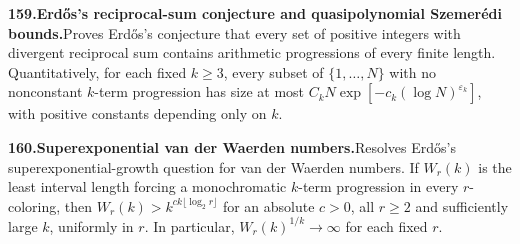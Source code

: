 \documentclass[11pt,a4paper]{article}
\begin{document}
  \par \begin{minipage}{\linewidth}
  \fontsize{10.5}{12.6}\selectfont\RaggedRight
  \hypertarget{result 159}{}
  {\bfseries\textcolor{muted}{159.}\enspace Erd\H{o}s's reciprocal-sum conjecture and quasipolynomial Szemer\'edi bounds.}\enspace Proves Erd\H{o}s's conjecture that every set of positive integers with divergent reciprocal sum contains arithmetic progressions of every finite length. Quantitatively, for each fixed $k\ge3$, every subset of $\{1,\ldots,N\}$ with no nonconstant $k$-term progression has size at most $C_kN\exp[-c_k(\log N)^{\varepsilon_k}]$, with positive constants depending only on $k$.\par
  \end{minipage}\par\vspace{5pt}



  \par \begin{minipage}{\linewidth}
  \fontsize{10.5}{12.6}\selectfont\RaggedRight
  \hypertarget{result 160}{}
  {\bfseries\textcolor{muted}{160.}\enspace Superexponential van der Waerden numbers.}\enspace Resolves Erd\H{o}s's superexponential-growth question for van der Waerden numbers. If $W_r(k)$ is the least interval length forcing a monochromatic $k$-term progression in every $r$-coloring, then $W_r(k)>k^{ck\lfloor\log_2 r\rfloor}$ for an absolute $c>0$, all $r\ge2$ and sufficiently large $k$, uniformly in $r$. In particular, $W_r(k)^{1/k}\to\infty$ for each fixed $r$.\par
  \end{minipage}\par\vspace{5pt}
\end{document}
